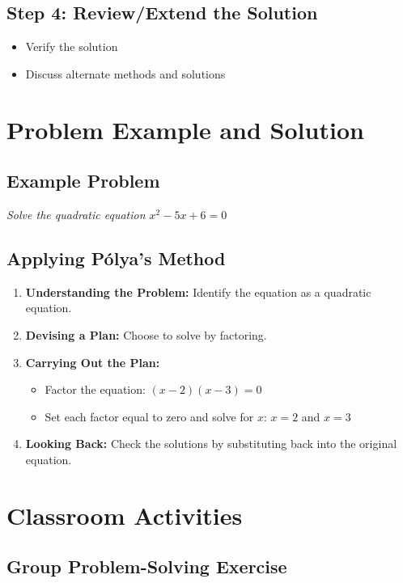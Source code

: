 \documentclass{book}
\begin{document}
\subsection{Step 4: Review/Extend the Solution}
\begin{itemize}
        \item Verify the solution
        \item Discuss alternate methods and solutions
\end{itemize}


\section{Problem Example and Solution}
\subsection{Example Problem}
\textit{Solve the quadratic equation \( x^2 - 5x + 6 = 0 \)}
\subsection{Applying Pólya's Method}
\begin{enumerate}
        \item \textbf{Understanding the Problem:} Identify the equation as a quadratic equation.
        \item \textbf{Devising a Plan:} Choose to solve by factoring.
        \item \textbf{Carrying Out the Plan:}
        \begin{itemize}
            \item Factor the equation: \( (x - 2)(x - 3) = 0 \)
            \item Set each factor equal to zero and solve for \( x \): \( x = 2 \) and \( x = 3 \)
        \end{itemize}
        \item \textbf{Looking Back:} Check the solutions by substituting back into the original equation.
\end{enumerate}


\section{Classroom Activities}
\subsection{Group Problem-Solving Exercise}
\end{document}
